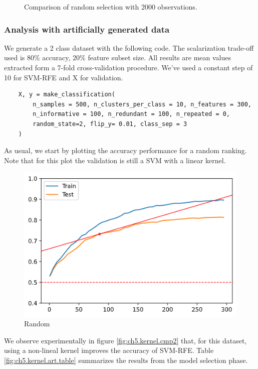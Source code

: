 \begin{figure}[h]
\begin{subfigure}[b]{0.32\linewidth}
    \end{subfigure}
    \caption{Comparison of random selection with 2000 observations.}
    \label{fig:ch5.kernel.cmp1}
\end{figure}

\subsubsection*{Analysis with artificially generated data}
\label{sec:ch5.kernel.art}

We generate a 2 class dataset with the following code.  The scalarization trade-off used is 80\% accuracy, 20\% feature subset size. All results are mean values extracted form a 7-fold cross-validation procedure. We've used a constant step of 10 for SVM-RFE and X for validation.

\begin{verbatim}
    X, y = make_classification(
        n_samples = 500, n_clusters_per_class = 10, n_features = 300, 
        n_informative = 100, n_redundant = 100, n_repeated = 0,
        random_state=2, flip_y= 0.01, class_sep = 3
    )
\end{verbatim}

As usual, we start by plotting the accuracy performance for a random ranking. Note that for this plot the validation is still a SVM with a linear kernel.

\begin{figure}[h]
    \centering
    \includegraphics[width=0.4\linewidth]{img/ch5/kernel/art_random.png}
    \caption{Random}
    \label{fig:ch5.kernel.random}
\end{figure}

We observe experimentally in figure \ref{fig:ch5.kernel.cmp2} that, for this dataset, using a non-lineal kernel improves the accuracy of SVM-RFE. Table \ref{fig:ch5.kernel.art.table} summarizes the results from the model selection phase.

